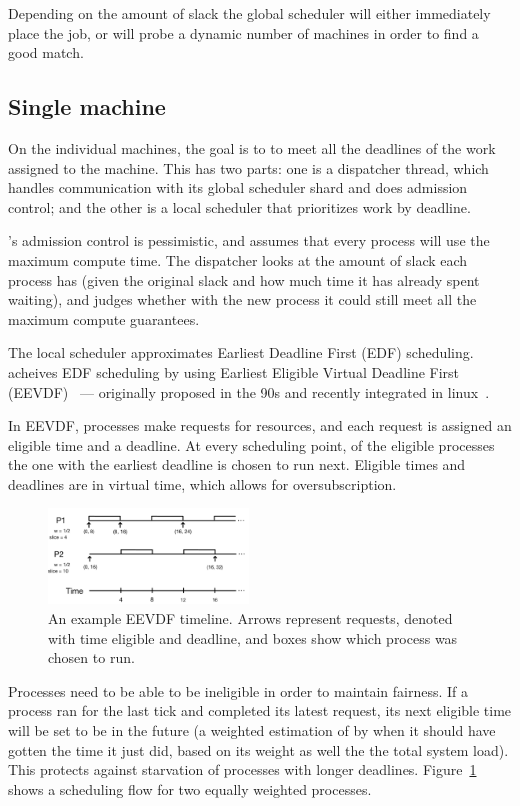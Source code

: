 Depending on the amount of slack the global scheduler will either immediately
place the job, or will probe a dynamic number of machines in order to find a
good match.


\subsection*{Single machine}

On the individual machines, the goal is to to meet all the deadlines of the work
assigned to the machine. This has two parts: one is a dispatcher thread, which
handles communication with its global scheduler shard and does admission
control; and the other is a local scheduler that prioritizes work by deadline.

\sysname{}'s admission control is pessimistic, and assumes that every process
will use the maximum compute time. The dispatcher looks at the amount of slack
each process has (given the original slack and how much time it has already
spent waiting), and judges whether with the new process it could still meet all
the maximum compute guarantees.


The local scheduler approximates Earliest Deadline First (EDF) scheduling.
\sysname{} acheives EDF scheduling by using Earliest Eligible Virtual Deadline
First (EEVDF)~\cite{eevdf} --- originally proposed in the 90s and recently
integrated in linux~\cite{linuxeevdf}.

In EEVDF, processes make requests for resources, and each request is assigned an
eligible time and a deadline. At every scheduling point, of the eligible
processes the one with the earliest deadline is chosen to run next. Eligible
times and deadlines are in virtual time, which allows for oversubscription. 

\begin{figure}[t!]
    \centering
    \includegraphics[height=1in]{img/eevdf.png}
    \caption{An example EEVDF timeline. Arrows represent requests, denoted with
        time eligible and deadline, and boxes show which process was chosen to
        run.}
    \label{fig:eevdf}
\end{figure}

Processes need to be able to be ineligible in order to maintain fairness. If a
process ran for the last tick and completed its latest request, its next
eligible time will be set to be in the future (a weighted estimation of by when
it should have gotten the time it just did, based on its weight as well the the
total system load). This protects against starvation of processes with longer
deadlines. Figure~\ref{fig:eevdf} shows a scheduling flow for two equally weighted
processes.

